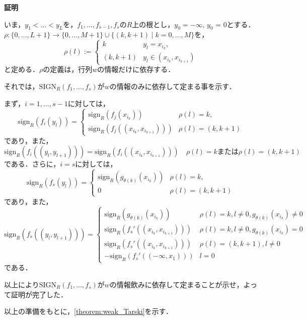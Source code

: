 \documentclass[uplatex, dvipdfmx]{jsarticle}
\makeatletter
\renewenvironment{proof}[1][\proofname]{\par
  \pushQED{\qed}%
  \normalfont \topsep6\p@\@plus6\p@\relax
  \trivlist
  \item\relax
  {\bfseries
  #1\@addpunct{.}}\hspace\labelsep\ignorespaces
}{%
  \popQED\endtrivlist\@endpefalse
}
\newcommand{\sign}{\mathrm{sign}}
\newcommand{\SIGN}{\mathrm{SIGN}}
\newcommand{\map}[3]{{#1}:{#2}\rightarrow{#3}}
\theoremstyle{definition}
\renewcommand{\proofname}{\textbf{証明}}
\makeatother
\begin{document}
\begin{proof}
     いま，$y_1 < \dots < y_L$を，$f_1, \dots, f_{s-1}, f_s$の$R$上の根とし，$y_0 = -\infty$, $y_0$ = 0とする．
     $\map{\rho}{\{0, \dots, L+1\}}{\{0, \dots, M+1\} \cup \{(k,k+1) \mid k=0, \dots, M\}}$を，
     \[
          \rho(l) := \begin{cases} 
               k & y_l = x_{i_k},\\
               (k, k+1) & y_l \in (x_{i_k}, x_{i_{k+1}})
          \end{cases}
     \]
     と定める．$\rho$の定義は，行列$w$の情報だけに依存する．

     それでは，$\SIGN_R(f_1, \dots, f_s)$が$w$の情報のみに依存して定まる事を示す．
     
     まず，$i=1, \dots, s-1$に対しては，
     \[
          \sign_R(f_i(y_l)) = \begin{cases}
               \sign_R(f_j(x_{i_k})) & \rho(l) = k,\\
               \sign_R(f_j((x_{i_k}, x_{i_{k+1}}))) & \rho(l) = (k, k+1)
          \end{cases}
     \]
     であり，また，
     \[
          \sign_R(f_i((y_l,y_{l+1}))) = \sign_R(f_i((x_{i_k}, x_{i_{k+1}}))) \quad \text{$\rho(l)=k$または$\rho(l)=(k,k+1)$}
     \]
     である．さらに，$i=s$に対しては，
     \[
          \sign_R(f_s(y_l)) = \begin{cases}
               \sign_R(g_{\theta(k)}(x_{i_k})) & \rho(l) = k,\\
               0 & \rho(l) = (k, k+1)
          \end{cases}
     \]
     であり，また，
     \[
          \sign_R(f_s((y_l,y_{l+1}))) = \begin{cases}
               \sign_R(g_{\theta(k)}(x_{i_k})) & \rho(l) = k, l \neq 0, g_{\theta(k)}(x_{i_k})\neq 0\\
               \sign_R(f_s'((x_{i_k},x_{i_{k+1}}))) & \rho(l)=k, l \neq 0, g_{\theta(k)}(x_{i_k}) = 0 \\
               \sign_R(f_s'((x_{i_k}, x_{i_{k+1}}))) & \rho(l) = (k, k+1), l \neq 0\\
               -\sign_R(f_s'((-\infty, x_1))) & l=0
          \end{cases}
     \]
     である．

     以上により$\SIGN_R(f_1, \dots, f_s)$が$w$の情報飲みに依存して定まることが示せ，よって証明が完了した．
\end{proof}

以上の準備をもとに，\cref{theorem:weak_Tarski}を示す．
\end{document}
